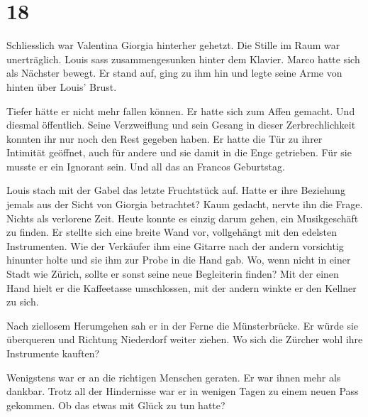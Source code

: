 \chapter{18}


Schliesslich war Valentina Giorgia hinterher gehetzt.
Die Stille im Raum war unerträglich. Louis sass zusammengesunken hinter dem Klavier. Marco hatte sich als Nächster bewegt. Er stand auf, ging zu ihm hin und legte seine Arme von hinten über Louis’ Brust.

Tiefer hätte er nicht mehr fallen können. Er hatte sich zum Affen gemacht. Und diesmal öffentlich.
Seine Verzweiflung und sein Gesang in dieser Zerbrechlichkeit konnten ihr
nur noch den Rest gegeben haben. Er hatte die Tür zu ihrer Intimität geöffnet, auch für andere und sie damit in die Enge getrieben. Für sie musste er ein Ignorant sein. Und all das an Francos Geburtstag.

\sectionbreak

Louis stach mit der Gabel das letzte Fruchtstück auf. Hatte er ihre Beziehung jemals
aus der Sicht von Giorgia betrachtet? Kaum gedacht, nervte ihn die Frage. Nichts als verlorene Zeit. Heute konnte es einzig darum gehen, ein Musikgeschäft zu finden. Er stellte sich eine breite Wand vor, vollgehängt mit den edelsten Instrumenten. Wie der Verkäufer ihm eine Gitarre nach der andern vorsichtig hinunter holte und sie ihm zur Probe in die Hand gab. Wo, wenn nicht in einer Stadt wie Zürich, sollte er sonst seine neue Begleiterin  finden? Mit der einen Hand hielt er die Kaffeetasse umschlossen, mit der andern winkte er den Kellner zu sich. 

Nach ziellosem Herumgehen sah er in der Ferne die Münsterbrücke. Er würde sie überqueren und Richtung Niederdorf weiter ziehen. Wo sich die Zürcher wohl ihre Instrumente kauften?

Wenigstens war er an die richtigen Menschen geraten. Er war ihnen mehr als dankbar. Trotz all der Hindernisse war er in wenigen Tagen zu einem neuen Pass gekommen. 
Ob das etwas mit Glück zu tun hatte? 

\sectionbreak


